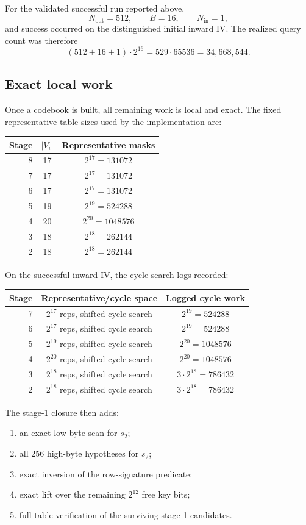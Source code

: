 \documentclass[11pt]{article}
\begin{document}
For the validated successful run reported above,
\[
N_{\mathrm{out}}=512,\qquad B=16,\qquad N_{\mathrm{in}}=1,
\]
and success occurred on the distinguished initial inward IV. The realized query count was therefore
\[
(512+16+1)\cdot 2^{16}
=
529\cdot 65536
=
34{,}668{,}544.
\]

\subsection{Exact local work}
Once a codebook is built, all remaining work is local and exact. The fixed representative-table sizes used by the implementation are:
\begin{center}
\begin{tabular}{rcc}
\toprule
Stage & $|V_i|$ & Representative masks \\
\midrule
8 & 17 & $2^{17}=131072$ \\
7 & 17 & $2^{17}=131072$ \\
6 & 17 & $2^{17}=131072$ \\
5 & 19 & $2^{19}=524288$ \\
4 & 20 & $2^{20}=1048576$ \\
3 & 18 & $2^{18}=262144$ \\
2 & 18 & $2^{18}=262144$ \\
\bottomrule
\end{tabular}
\end{center}

On the successful inward IV, the cycle-search logs recorded:
\begin{center}
\begin{tabular}{rcc}
\toprule
Stage & Representative/cycle space & Logged cycle work \\
\midrule
7 & $2^{17}$ reps, shifted cycle search & $2^{19}=524288$ \\
6 & $2^{17}$ reps, shifted cycle search & $2^{19}=524288$ \\
5 & $2^{19}$ reps, shifted cycle search & $2^{20}=1048576$ \\
4 & $2^{20}$ reps, shifted cycle search & $2^{20}=1048576$ \\
3 & $2^{18}$ reps, shifted cycle search & $3\cdot 2^{18}=786432$ \\
2 & $2^{18}$ reps, shifted cycle search & $3\cdot 2^{18}=786432$ \\
\bottomrule
\end{tabular}
\end{center}

The stage-1 closure then adds:
\begin{enumerate}[label=\arabic*.,leftmargin=1.5em]
\item an exact low-byte scan for $s_2$;
\item all $256$ high-byte hypotheses for $s_2$;
\item exact inversion of the row-signature predicate;
\item exact lift over the remaining $2^{12}$ free key bits;
\item full table verification of the surviving stage-1 candidates.
\end{enumerate}
\end{document}
